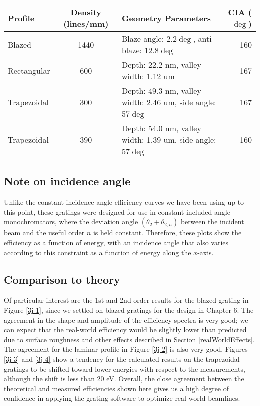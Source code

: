 \begin{table}[htbp]
\centering
{}
\begin{tabular}{@{} l c l r @{}} %
\toprule
Profile    &  Density (lines/mm)& Geometry Parameters & CIA ($\deg$)\\
\midrule
Blazed & 1440 & Blaze angle: 2.2$\deg$, anti-blaze: 12.8$\deg$ & 160 \\
Rectangular & 600 & Depth: 22.2 nm, valley width: 1.12 um & 167 \\
Trapezoidal & 300 & Depth: 49.3 nm, valley width: 2.46 um, side angle: 57$\deg$ & 167\\
Trapezoidal & 390 & Depth: 54.0 nm, valley width: 1.39 um, side angle: 57$\deg$ & 160\\
\bottomrule
\end{tabular}
\label{3j-table}
\end{table}

\subsection{Note on incidence angle}
Unlike the constant incidence angle efficiency curves we have been using up to this point, these gratings were designed for use in constant-included-angle monochromators, where the deviation angle $(\theta_2 + \theta_{2,n})$ between the incident beam and the useful order $n$ is held constant.  Therefore, these plots show the efficiency as a function of energy, with an incidence angle that also varies according to this constraint as a function of energy along the $x$-axis.

\subsection{Comparison to theory}
Of particular interest are the 1st and 2nd order results for the blazed grating in Figure \ref{3j-1}, since we settled on blazed gratings for the design in Chapter 6.  The agreement in the shape and amplitude of the efficiency spectra is very good; we can expect that the real-world efficiency would be slightly lower than predicted due to surface roughness and other effects described in Section \ref{realWorldEffects}.  The agreement for the laminar profile in Figure \ref{3j-2} is also very good.  Figures \ref{3j-3} and \ref{3j-4} show a tendency for the calculated results on the trapezoidal gratings to be shifted toward lower energies with respect to the measurements, although the shift is less than 20 eV.  Overall, the close agreement between the theoretical and measured efficiencies shown here gives us a high degree of confidence in applying the grating software to optimize real-world beamlines.
 
